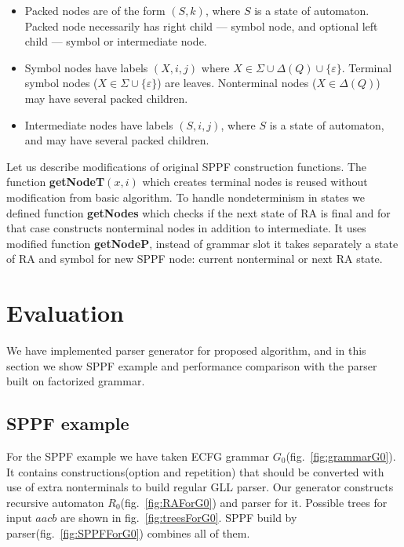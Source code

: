 \documentclass[runningheads,a4paper]{llncs}
\begin{document}
\begin{itemize}
\item Packed nodes are of the form $(S, k)$, where $S$ is a state of automaton. Packed node necessarily has right child --- symbol node, and optional left child --- symbol or intermediate node.
\item Symbol nodes have labels $(X, i, j)$ where $X \in \Sigma \cup \Delta(Q) \cup \{\varepsilon\}$.
Terminal symbol nodes ($X \in \Sigma \cup \{\varepsilon\}$) are leaves. 
Nonterminal nodes ($X \in \Delta(Q)$) may have several packed children. 
\item Intermediate nodes have labels $ (S, i, j) $, where $S$ is a state of automaton, and may have several packed children. 
\end{itemize}

Let us describe modifications of original SPPF construction functions.
The function \textbf{getNodeT$(x,i)$} which creates terminal nodes is reused without modification from basic algorithm.
To handle nondeterminism in states we defined function \textbf{getNodes} which checks if the next state of RA
is final and for that case constructs nonterminal nodes in addition to intermediate.
It uses modified function \textbf{getNodeP}, instead of grammar slot it takes separately a 
state of RA and symbol for new SPPF node: current nonterminal or next RA state.




\section{Evaluation}

We have implemented parser generator for proposed algorithm, and
in this section we show SPPF example and performance comparison 
with the parser built on factorized grammar.

\subsection{SPPF example}

For the SPPF example we have taken ECFG grammar $G_0$(fig.~\ref{fig:grammarG0}).
It contains constructions(option and repetition) that should be converted with
use of extra nonterminals to build regular GLL parser. Our generator constructs
recursive automaton $R_0$(fig.~\ref{fig:RAForG0}) and parser for it.
Possible trees for input $ aacb $ are shown in fig.~\ref{fig:treesForG0}.
SPPF build by parser(fig.~\ref{fig:SPPFForG0}) combines all of them.
\end{document}
